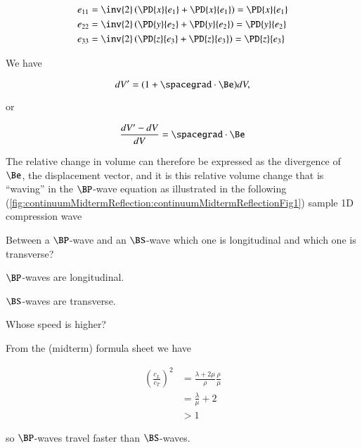 \begin{Answer}[ref={problem:elastic:displacements:midtermQ1a}]
\begin{align}\label{eqn:continuumMidTermReflection:90}
e_{11} &= \inv{2} \left( \PD{x}{e_1} +\PD{x}{e_1} \right) = \PD{x}{e_1} \\
e_{22} &= \inv{2} \left( \PD{y}{e_2} +\PD{y}{e_2} \right) = \PD{y}{e_2} \\
e_{33} &= \inv{2} \left( \PD{z}{e_3} +\PD{z}{e_3} \right) = \PD{z}{e_3}
\end{align}

We have

\begin{equation}\label{eqn:continuumMidTermReflection:110}
dV' = (1 + \spacegrad \cdot \Be) dV,
\end{equation}

or

\begin{equation}\label{eqn:continuumMidTermReflection:130}
\frac{dV' - dV}{dV} = \spacegrad \cdot \Be
\end{equation}

The relative change in volume can therefore be expressed as the divergence of $\Be$, the displacement vector, and it is this relative volume change that is ``waving'' in the $\BP$-wave equation as illustrated in the following (\ref{fig:continuumMidtermReflection:continuumMidtermReflectionFig1}) sample 1D compression wave

\end{Answer}

\begin{Exercise}[title={$\BP$-waves, $\BS$-waves.  Longitudinal or transverse.}, label={problem:elastic:displacements:midtermQ1b}]
Between a $\BP$-wave and an $\BS$-wave which one is longitudinal and which one is transverse?
\end{Exercise}

\begin{Answer}[ref={problem:elastic:displacements:midtermQ1b}]
$\BP$-waves are longitudinal.

$\BS$-waves are transverse.
\end{Answer}

\begin{Exercise}[title={$\BP$-waves, $\BS$-waves.  Speed.}, label={problem:elastic:displacements:midtermQ1c}]
Whose speed is higher?
\end{Exercise}

\begin{Answer}[ref={problem:elastic:displacements:midtermQ1c}]
From the (midterm) formula sheet we have

\begin{align*}
\left( \frac{c_L}{c_T} \right)^2 
&= \frac{ \lambda + 2 \mu}{\rho} \frac{\rho}{\mu}  \\
&= \frac{\lambda}{\mu} + 2  \\
&> 1
\end{align*}

so $\BP$-waves travel faster than $\BS$-waves.
\end{Answer}

